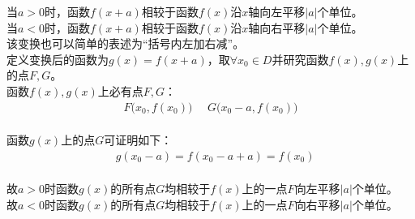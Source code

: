 \documentclass[UTF8]{ctexart}
\begin{document}
    当$a>0$时，函数$f(x+a)$相较于函数$f(x)$沿$x$轴向左平移$|a|$个单位。\\[3mm]
    当$a<0$时，函数$f(x+a)$相较于函数$f(x)$沿$x$轴向右平移$|a|$个单位。\\[3mm]
    该变换也可以简单的表述为“括号内左加右减”。\\[6mm]
    定义变换后的函数为$g(x)=f(x+a)$，取$\forall x_0\in D$并研究函数$f(x),g(x)$上的点$F,G$。\\[3mm]
    函数$f(x),g(x)$上必有点$F,G$：
    \begin{align}
        F\big(x_0,f(x_0)\big)~~~~~~G\big(x_0-a,f(x_0)\big)
    \end{align}\\
    函数$g(x)$上的点$G$可证明如下：
    \begin{align}
        &g(x_0-a)=f(x_0-a+a)=f(x_0)
    \end{align}\\
    故$a>0$时函数$g(x)$的所有点$G$均相较于$f(x)$上的一点$F$向左平移$|a|$个单位。\\[3mm]
    故$a<0$时函数$g(x)$的所有点$G$均相较于$f(x)$上的一点$F$向右平移$|a|$个单位。

\newpage
\end{document}
